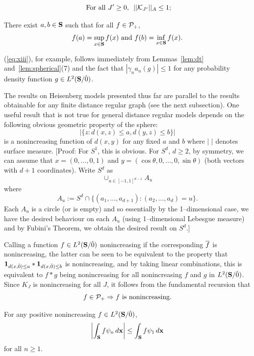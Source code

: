 \begin{equation} \label{eq:xiii}
\mbox{ For all } J' \geq 0, \,\,\, || \calk_{J'} ||_A \leq 1;
\end{equation}

There exist $a,b\in \S$ such that for all  $f\in \PP_+$,
\begin{equation} \label{eq:xiiii}
f(a)=\sup_{x\in\S} f(x) \mbox{ and } f(b)=\inf_{x\in\S} f(x).
\end{equation}

(\ref{eq:xiii}), for example, follows immediately from Lemmas~\ref{lem:dt} 
and~\ref{lem:spherical}(7) and the fact that $|\gamma_n a_n(g)|\le 1$ for any 
probability density function $g\in \ltsg$.

The results on Heisenberg models presented thus far are parallel to 
the results obtainable for any finite distance regular graph (see
the next subsection).  One useful result that is not true for general 
distance regular models depends on the following obvious geometric property 
of the sphere:
$$|\{ z : d(x,z) \leq a , d(y,z) \leq b \}|$$
is a nonincreasing function of $d(x,y)$ for any fixed $a$ and $b$ where
$|\,\,|$ denotes surface measure.
[Proof: For $S^1$, this is obvious. For $S^d$, $d\ge 2$, by symmetry, we can
assume that $x=(0,\ldots,0,1)$ and $y=(\cos\theta,0,\ldots, 0, \sin\theta)$
(both vectors with $d+1$ coordinates). Write $S^d$ as
$$
\cup_{u\in [-1,1]^{d-1}} A_u
$$
where 
$$
A_u:=S^d\cap\{(a_1,\ldots,a_{d+1}):(a_2,\ldots,a_{d})=u\}.
$$
Each $A_u$ is a circle (or is empty) and so essentially by the 1--dimensional
case, we have the desired behaviour on each $A_u$ (using 1--dimensional
Lebesgue measure) and by Fubini's Theorem, we obtain the desired result
on $S^d$.]

Calling a function $f\in\ltsg$ nonincreasing if the corresponding $\fb$ is
nonincreasing, the latter can be seen to be 
equivalent to the property that $\one_{d(x , \zero) \leq a} * 
\one_{d(x , \zero) \leq b}$
is nonincreasing, and by taking linear combinations, this is equivalent 
to $f * g$ being nonincreasing for all nonincreasing $f$ and $g$ in $\ltsg$.  
Since $K_J$ is nonincreasing for all $J$,
it follows from the fundamental recursion that
%
\begin{equation} \label{eq:xiv}
f \in \PP_+ \Rightarrow f \mbox{ is nonincreasing}  .
\end{equation}

\begin{lem} \label{lem:incr}
For any positive nonincreasing $f \in \ltsg$, 
$$
\left|\int_{\S} f \f_n \, \dx\right| \le \int_{\S} f \f_1 \, \dx
$$
for all $n \ge 1 $.
\end{lem}

